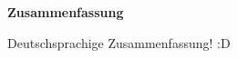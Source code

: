 

\clearemptydoublepage






\vspace*{2cm}
\begin{center}
{\Large \bf Zusammenfassung}
\end{center}
\vspace{1cm}

Deutschsprachige Zusammenfassung! :D
